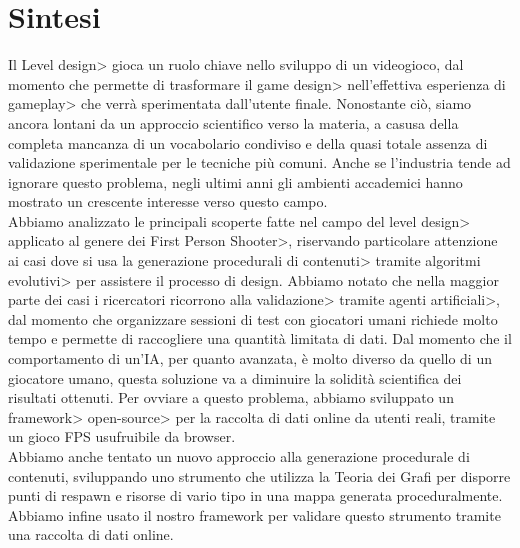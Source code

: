 \chapter{Sintesi}

Il \<Level design> gioca un ruolo chiave nello sviluppo di un videogioco, dal momento che permette di trasformare il \<game design> nell'effettiva esperienza di \<gameplay> che verrà sperimentata dall'utente finale. Nonostante ciò, siamo ancora lontani da un approccio scientifico verso la materia, a casusa della completa mancanza di un vocabolario condiviso e della quasi totale assenza di validazione sperimentale per le tecniche più comuni. Anche se l'industria tende ad ignorare questo problema, negli ultimi anni gli ambienti accademici hanno mostrato un crescente interesse verso questo campo. \\
Abbiamo analizzato le principali scoperte fatte nel campo del \<level design> applicato al genere dei \<First Person Shooter>, riservando particolare attenzione ai casi dove si usa la \<generazione procedurali di contenuti> tramite \<algoritmi evolutivi> per assistere il processo di design. Abbiamo notato che nella maggior parte dei casi i ricercatori ricorrono alla \<validazione> tramite \<agenti artificiali>, dal momento che organizzare sessioni di test con giocatori umani richiede molto tempo e permette di raccogliere una quantità limitata di dati. Dal momento che il comportamento di un'IA, per quanto avanzata, è molto diverso da quello di un giocatore umano, questa soluzione va a diminuire la solidità scientifica dei risultati ottenuti. Per ovviare a questo problema, abbiamo sviluppato un \<framework> \<open-source> per la raccolta di dati online da utenti reali, tramite un gioco FPS usufruibile da browser. \\
Abbiamo anche tentato un nuovo approccio alla generazione procedurale di contenuti, sviluppando uno strumento che utilizza la Teoria dei Grafi per disporre punti di respawn e risorse di vario tipo in una mappa generata proceduralmente. Abbiamo infine usato il nostro framework per validare questo strumento tramite una raccolta di dati online.